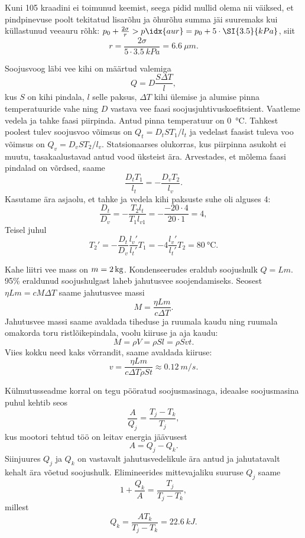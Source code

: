 \documentclass[10pt]{article}
\begin{document}
{Kuni 105 kraadini ei toimunud keemist, seega pidid mullid olema nii väiksed, et pindpinevuse poolt tekitatud lisarõhu ja õhurõhu summa jäi suuremaks kui küllastunud veeauru rõhk: $p_0 + \frac{2\sigma}{r} > p\idx{aur} = p_0 + 5 \cdot \SI{3.5}{kPa}$, siit 
\[
r = \frac{2\sigma}{5\cdot\SI{3.5}{kPa}} = \SI{6.6}{\mu m}.
\]
\probend
\bigskip


\solu
Soojusvoog läbi vee kihi on määrtud valemiga
\[
Q = D\frac{S\Delta T}{l},
\]
kus $S$ on kihi pindala, $l$ selle paksus, $\Delta T$ kihi ülemise ja alumise pinna temperatuuride vahe ning $D$ vastava vee faasi soojusjuhtivuskoefitsient. Vaatleme vedela ja tahke faasi piirpinda. Antud pinna temperatuur on \SI{0}{\degreeCelsius}. Tahkest poolest tulev soojusvoo võimsus on
$Q_t = D_tST_1/l_t$
ja vedelast faasist tuleva voo võimsus on
$Q_v = D_vST_2/l_v$.
Statsionaarses olukorras, kus piirpinna asukoht ei muutu, tasakaalustavad antud vood üksteist ära. Arvestades, et mõlema faasi pindalad on võrdsed, saame
\[
\frac{D_tT_1}{l_t} = -\frac{D_vT_2}{l_v}.
\]
Kasutame ära asjaolu, et tahke ja vedela kihi paksuste suhe oli alguses \num{4}:
\[
\frac{D_t}{D_v} = -\frac{T_{2} l_{t}}{T_1 l_{v1}}=-\frac{\num{-20}\cdot \num{4}}{\num{20}\cdot \num{1}} = \num{4},
\]
Teisel juhul
\[
T_{2}' = -\frac{D_{t}}{D_{v}}\frac{l_{v}'}{l_{t}'} T_1 = \num{-4}\frac{l_v'}{l_t'} T_2 = \SI{80}{\degreeCelsius}.
\]
\probend
\bigskip


\solu
Kahe liitri vee mass on $m=\SI 2{kg}$. Kondenseerudes eraldub soojushulk $Q=Lm$.
95\% eraldunud soojushulgast laheb jahutusvee soojendamiseks. Seosest $\eta Lm=cM\Delta T$ saame jahutusvee massi
\[M=\frac {\eta L m}{c\Delta T}.\]
Jahutusvee massi saame avaldada tiheduse ja ruumala kaudu ning ruumala omakorda toru ristlõikepindala, voolu kiiruse ja aja kaudu:
\[M=\rho V=\rho Sl=\rho Svt.\]
Viies kokku need kaks võrrandit, saame avaldada kiiruse:
\[v=\frac {\eta Lm}{c\Delta T \rho S t}\approx \SI{0,12}{m/s}.\]
\probend
\bigskip


\solu
Külmutusseadme korral on tegu pööratud soojusmasinaga, ideaalse
soojusmasina puhul kehtib seos
\[
\frac{A}{Q_{j}}=\frac{T_{j} - T_{k}}{T_{j}},
\]
kus mootori tehtud töö
on leitav energia jäävusest
\[
A = Q_j - Q_k.
\]
Siinjuures $Q_j$ ja $Q_k$ on vastavalt jahutusvedelikule ära antud ja jahutatavalt kehalt
ära võetud soojushulk. Elimineerides mittevajaliku suuruse $Q_j$ saame
\[
1+\frac{Q_{k}}{A}=\frac{T_{j}}{T_{j}-T_{k}},
\]
millest 
\[
Q_{k}=\frac{A T_{k}}{T_{j}-T_{k}} = \SI{22,6}{kJ}.
\]
\probend
\bigskip

}
\end{document}
